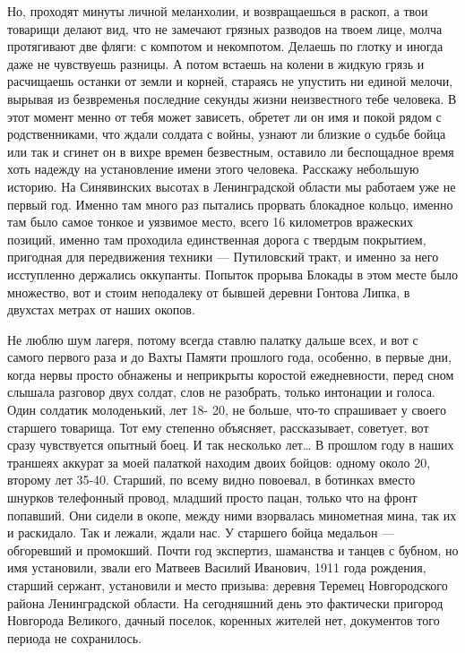 Но, проходят минуты личной меланхолии, и возвращаешься в раскоп, а твои
товарищи делают вид, что не замечают грязных разводов на твоем лице, молча
протягивают две фляги: с компотом и некомпотом. Делаешь по глотку и иногда даже
не чувствуешь разницы. А потом встаешь на колени в жидкую грязь и расчищаешь
останки от земли и корней, стараясь не упустить ни единой мелочи, вырывая из
безвременья последние секунды жизни неизвестного тебе человека. В этот момент
менно от тебя может зависеть, обретет ли он имя и покой рядом с родственниками,
что ждали солдата с войны, узнают ли близкие о судьбе бойца или так и сгинет он
в вихре времен безвестным, оставило ли беспощадное время хоть надежду на
установление имени этого человека.  Расскажу небольшую историю. На Синявинских
высотах в Ленинградской области мы работаем уже не первый год. Именно там много
раз пытались прорвать блокадное кольцо, именно там было самое тонкое и уязвимое
место, всего 16 километров вражеских позиций, именно там проходила единственная
дорога с твердым покрытием, пригодная для передвижения техники --- Путиловский
тракт, и именно за него исступленно держались оккупанты. Попыток прорыва
Блокады в этом месте было множество, вот и стоим неподалеку от бывшей деревни
Гонтова Липка, в двухстах метрах от наших окопов.

Не люблю шум лагеря, потому всегда ставлю палатку дальше всех, и вот с самого первого раза и до Вахты Памяти прошлого года, особенно, в первые дни, когда нервы просто обнажены и неприкрыты коростой ежедневности, перед сном слышала разговор двух солдат, слов не разобрать, только интонации и голоса. Один солдатик молоденький, лет 18- 20, не больше, что-то спрашивает у своего старшего товарища. Тот ему степенно объясняет, рассказывает, советует, вот сразу чувствуется опытный боец. И так несколько лет…
В прошлом году в наших траншеях аккурат за моей палаткой находим двоих бойцов: одному около 20, второму лет 35-40. Старший, по всему видно повоевал, в ботинках вместо шнурков телефонный провод, младший просто пацан, только что на фронт попавший. Они сидели в окопе, между ними взорвалась минометная мина, так их и раскидало. Так и лежали, ждали нас. У старшего бойца медальон --- обгоревший и промокший. Почти год экспертиз, шаманства и танцев с бубном, но имя установили, звали его Матвеев Василий Иванович, 1911 года рождения, старший сержант, установили и место призыва: деревня Теремец Новгородского района Ленинградской области. На сегодняшний день это фактически пригород Новгорода Великого, дачный поселок, коренных жителей нет, документов того периода не сохранилось.

